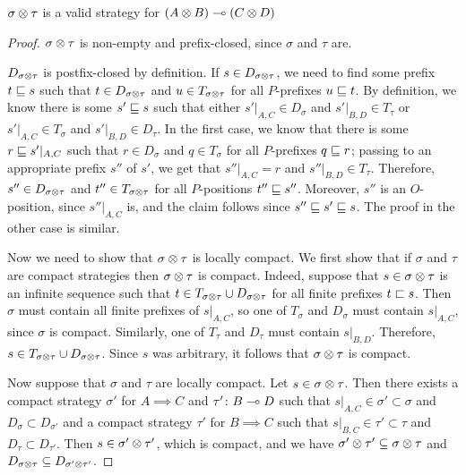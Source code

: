 \documentclass{article}
\begin{document}
\begin{proposition}
  $\sigma\otimes\tau$ is a valid strategy for $(A\otimes B)\multimap (C\otimes D)$
  \begin{proof}
    $\sigma\otimes\tau$ is non-empty and prefix-closed, since $\sigma$ and $\tau$ are.  
    
    $D_{\sigma\otimes\tau}$ is postfix-closed by definition.  If $s\in D_{\sigma\otimes\tau}$, we need to find some prefix $t\sqsubseteq s$ such that $t\in D_{\sigma\otimes\tau}$ and $u\in T_{\sigma\otimes\tau}$ for all $P$-prefixes $u\sqsubseteq t$.  By definition, we know there is some $s'\sqsubseteq s$ such that either $s'\vert_{A,C}\in D_\sigma$ and $s'\vert_{B,D}\in T_\tau$ or $s'\vert_{A,C}\in T_\sigma$ and $s'\vert_{B,D}\in D_\tau$.  In the first case, we know that there is some $r\sqsubseteq s'\vert_{A,C}$ such that $r\in D_\sigma$ and $q\in T_\sigma$ for all $P$-prefixes $q\sqsubseteq r$; passing to an appropriate prefix $s''$ of $s'$, we get that $s''\vert_{A,C}=r$ and $s''\vert_{B,D}\in T_\tau$.  Therefore, $s''\in D_{\sigma\otimes\tau}$ and $t''\in T_{\sigma\otimes\tau}$ for all $P$-positions $t''\sqsubseteq s''$.  Moreover, $s''$ is an $O$-position, since $s''\vert_{A,C}$ is, and the claim follows since $s''\sqsubseteq s'\sqsubseteq s$.  The proof in the other case is similar.

    Now we need to show that $\sigma\otimes\tau$ is locally compact.  We first show that if $\sigma$ and $\tau$ are compact strategies then $\sigma\otimes\tau$ is compact.  Indeed, suppose that $s\in\sigma\otimes\tau$ is an infinite sequence such that $t\in T_{\sigma\otimes\tau}\cup D_{\sigma\otimes\tau}$ for all finite prefixes $t\sqsubset s$.  Then $\sigma$ must contain all finite prefixes of $s\vert_{A,C}$, so one of $T_\sigma$ and $D_\sigma$ must contain $s\vert_{A,C}$, since $\sigma$ is compact.  Similarly, one of $T_{\tau}$ and $D_\tau$ must contain $s\vert_{B,D}$.  Therefore, $s\in T_{\sigma\otimes\tau}\cup D_{\sigma\otimes\tau}$.  Since $s$ was arbitrary, it follows that $\sigma\otimes\tau$ is compact.  

    Now suppose that $\sigma$ and $\tau$ are locally compact.  Let $s\in\sigma\otimes\tau$.  Then there exists a compact strategy $\sigma'$ for $A\implies C$ and $\tau'\colon B\multimap D$ such that $s\vert_{A,C}\in\sigma'\subset\sigma$ and $D_\sigma\subset D_{\sigma'}$ and a compact strategy $\tau'$ for $B\implies C$ such that $s\vert_{B,C}\in\tau'\subset \tau$ and $D_\tau\subset D_{\tau'}$.  Then $s\in\sigma'\otimes\tau'$, which is compact, and we have $\sigma'\otimes\tau'\subseteq\sigma\otimes\tau$ and $D_{\sigma\otimes\tau}\subseteq D_{\sigma'\otimes\tau'}$.


\end{proof}
\end{proposition}
\end{document}
